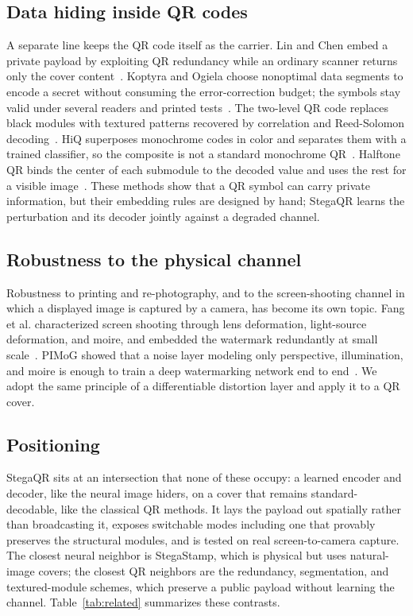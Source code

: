 \documentclass[conference]{IEEEtran}
\begin{document}
\subsection{Data hiding inside QR codes}
A separate line keeps the QR code itself as the carrier. Lin and Chen embed a private
payload by exploiting QR redundancy while an ordinary scanner returns only the cover
content~\cite{lin2016qr}. Koptyra and Ogiela choose nonoptimal data segments to encode a
secret without consuming the error-correction budget; the symbols stay valid under
several readers and printed tests~\cite{koptyra2024segmentation}. The two-level QR code
replaces black modules with textured patterns recovered by correlation and Reed-Solomon
decoding~\cite{tkachenko2016twolevel}. HiQ superposes monochrome codes in color and
separates them with a trained classifier, so the composite is not a standard monochrome
QR~\cite{yang2018hiq}. Halftone QR binds the center of each submodule to the decoded
value and uses the rest for a visible image~\cite{chu2013halftone}. These methods show
that a QR symbol can carry private information, but their embedding rules are designed
by hand; StegaQR learns the perturbation and its decoder jointly against a degraded
channel.

\subsection{Robustness to the physical channel}
Robustness to printing and re-photography, and to the screen-shooting channel in which
a displayed image is captured by a camera, has become its own topic. Fang et al.
characterized screen shooting through lens deformation, light-source deformation, and
moire, and embedded the watermark redundantly at small scale~\cite{fang2019screen}.
PIMoG showed that a noise layer modeling only perspective, illumination, and moire is
enough to train a deep watermarking network end to end~\cite{fang2022pimog}. We adopt
the same principle of a differentiable distortion layer and apply it to a QR cover.

\subsection{Positioning}
StegaQR sits at an intersection that none of these occupy: a learned encoder and
decoder, like the neural image hiders, on a cover that remains standard-decodable, like
the classical QR methods. It lays the payload out spatially rather than broadcasting it,
exposes switchable modes including one that provably preserves the structural modules,
and is tested on real screen-to-camera capture. The closest neural neighbor is
StegaStamp, which is physical but uses natural-image covers; the closest QR neighbors are
the redundancy, segmentation, and textured-module schemes, which preserve a public payload
without learning the channel. Table~\ref{tab:related} summarizes these contrasts.
\end{document}
